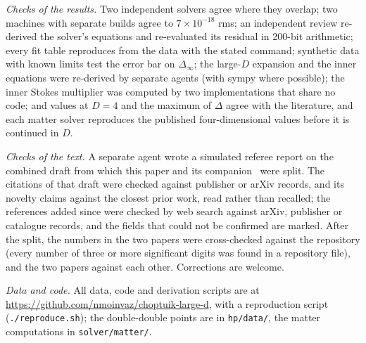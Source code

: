 \documentclass[aps,prd,onecolumn,superscriptaddress,nofootinbib,10pt]{revtex4-2}
\newcommand{\Dinf}{\Delta_\infty}
\begin{document}
\emph{Checks of the results.} Two independent solvers agree where they overlap; two machines with separate builds agree
to $7\times10^{-18}$ rms; an independent review re-derived the solver's equations and re-evaluated its residual in
200-bit arithmetic; every fit table reproduces from the data with the stated command; synthetic data with known limits
test the error bar on $\Dinf$; the large-$D$ expansion and the inner equations were re-derived by separate agents (with
sympy where possible); the inner Stokes multiplier was computed by two implementations that share no code; and values at
$D = 4$ and the maximum of $\Delta$ agree with the literature, and each matter solver reproduces the published
four-dimensional values before it is continued in $D$.

\emph{Checks of the text.} A separate agent wrote a simulated referee report on the combined draft from which this paper
and its companion~\cite{math} were split. The citations of that draft were checked against publisher or arXiv records,
and its novelty claims against the closest prior work, read rather than recalled; the references added since were checked
by web search against arXiv, publisher or catalogue records, and the fields that could not be confirmed are marked. After
the split, the numbers in the two papers were cross-checked against the repository (every number of three or more
significant digits was found in a repository file), and the two papers against each other. Corrections are welcome.

\emph{Data and code.} All data, code and derivation scripts are at
\url{https://github.com/nmoinvaz/choptuik-large-d}, with a reproduction script (\texttt{./reproduce.sh}); the
double-double points are in \texttt{hp/data/}, the matter computations in \texttt{solver/matter/}.
\end{document}
